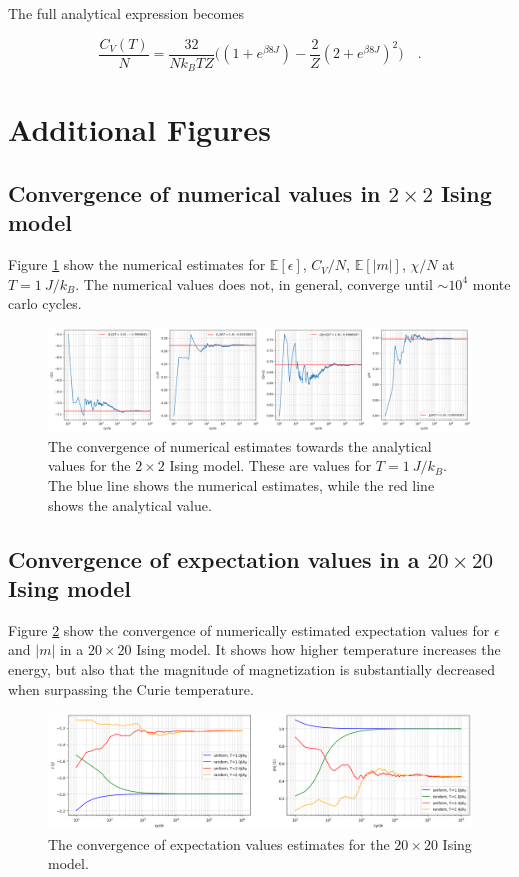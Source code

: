 \documentclass[../main_proj4_correct_template.tex]{subfiles}
\begin{document}
\noindent The full analytical expression becomes 

\begin{equation*}
    \frac{C_V(T)}{N} = \frac{32}{Nk_BTZ} \bigg((1+e^{\beta8J}) - \frac{2}{Z}(2+e^{\beta8J})^{2}\bigg) \quad.
\end{equation*}

\section{Additional Figures}

\subsection{Convergence of numerical values in $2\times 2$ Ising model}

Figure \ref{fig:p4_appB_p4_convergence} show the numerical estimates for $\mathbb{E}[\epsilon]$, $C_V/N$, $\mathbb{E}[|m|]$, $\chi/N$ at $T = 1~J/k_B$. The numerical values does not, in general, converge until $\sim 10^{4}$ monte carlo cycles. 

\begin{figure}[h!]
    \centering
    \includegraphics[width=0.8\linewidth]{Project 4/figures/p4_convergence.png}
    \caption{The convergence of numerical estimates towards the analytical values for the $2\times 2$ Ising model. These are values for $T=1~J/k_B$. The blue line shows the numerical estimates, while the red line shows the analytical value.}
    \label{fig:p4_appB_p4_convergence}
\end{figure}

\subsection{Convergence of expectation values in a $20\times 20$ Ising model}

Figure \ref{fig:p4_appb_p5_expectation_convergence} show the convergence of numerically estimated expectation values for $\epsilon$ and $|m|$ in a $20\times 20$ Ising model. It shows how higher temperature increases the energy, but also that the magnitude of magnetization is substantially decreased when surpassing the Curie temperature. 

\begin{figure}[h!]
    \centering
    \includegraphics[width=0.8\linewidth]{Project 4/figures/p5_equilibration_expectation.png}
    \caption{The convergence of expectation values estimates for the $20\times 20$ Ising model.}
    \label{fig:p4_appb_p5_expectation_convergence}
\end{figure}
\end{document}
